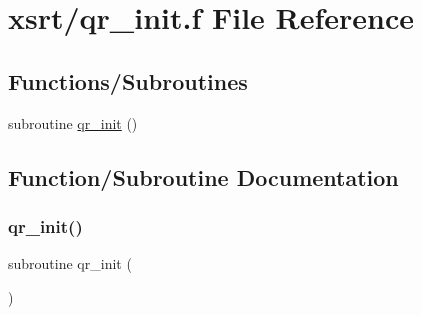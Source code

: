 \hypertarget{xsrt_2qr__init_8f}{}\section{xsrt/qr\+\_\+init.f File Reference}
\label{xsrt_2qr__init_8f}
\subsection*{Functions/\+Subroutines}
\begin{DoxyCompactItemize}
\item 
subroutine \hyperlink{xsrt_2qr__init_8f_af7240c14716ac7a794546a49beaf0d88}{qr\+\_\+init} ()
\end{DoxyCompactItemize}


\subsection{Function/\+Subroutine Documentation}
\mbox{\label{xsrt_2qr__init_8f_af7240c14716ac7a794546a49beaf0d88}} 
\subsubsection{\texorpdfstring{qr\+\_\+init()}{qr\_init()}}
{\footnotesize\ttfamily subroutine qr\+\_\+init (\begin{DoxyParamCaption}{ }\end{DoxyParamCaption})}

